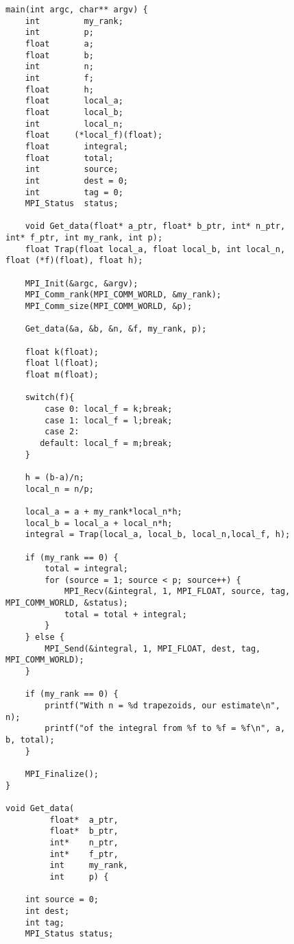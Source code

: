 \documentclass[11pt,a4paper,onecolumn]{article}
\begin{document}
\begin{figure}[h!]
\begin{lstlisting}[style=cc]
main(int argc, char** argv) {
    int         my_rank;
    int         p;
    float       a;
    float       b;
    int         n;
    int         f;
    float       h;
    float       local_a;
    float       local_b;
    int         local_n;
    float     (*local_f)(float);
    float       integral;
    float       total;
    int         source;
    int         dest = 0;
    int         tag = 0;
    MPI_Status  status;

    void Get_data(float* a_ptr, float* b_ptr, int* n_ptr, int* f_ptr, int my_rank, int p);
    float Trap(float local_a, float local_b, int local_n, float (*f)(float), float h);

    MPI_Init(&argc, &argv);
    MPI_Comm_rank(MPI_COMM_WORLD, &my_rank);
    MPI_Comm_size(MPI_COMM_WORLD, &p);

    Get_data(&a, &b, &n, &f, my_rank, p);

    float k(float);
    float l(float);
    float m(float);

    switch(f){
        case 0: local_f = k;break;
        case 1: local_f = l;break;
        case 2:
       default: local_f = m;break;
    }

    h = (b-a)/n;
    local_n = n/p;

    local_a = a + my_rank*local_n*h;
    local_b = local_a + local_n*h;
    integral = Trap(local_a, local_b, local_n,local_f, h);

    if (my_rank == 0) {
        total = integral;
        for (source = 1; source < p; source++) {
            MPI_Recv(&integral, 1, MPI_FLOAT, source, tag, MPI_COMM_WORLD, &status);
            total = total + integral;
        }
    } else {   
        MPI_Send(&integral, 1, MPI_FLOAT, dest, tag, MPI_COMM_WORLD);
    }

    if (my_rank == 0) {
        printf("With n = %d trapezoids, our estimate\n", n);
        printf("of the integral from %f to %f = %f\n", a, b, total); 
    }

    MPI_Finalize();
}

void Get_data(
         float*  a_ptr, 
         float*  b_ptr, 
         int*    n_ptr,
         int*    f_ptr,
         int     my_rank, 
         int     p) {

    int source = 0;
    int dest;
    int tag;
    MPI_Status status;


\end{lstlisting}
\end{figure}
\end{document}
